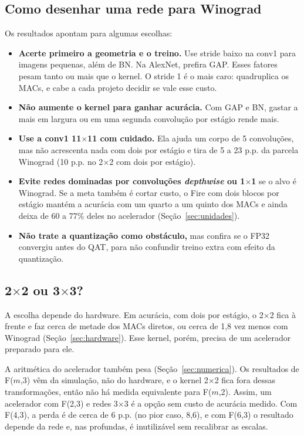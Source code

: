 \documentclass[conference]{IEEEtran}
\newcommand{\by}{\ensuremath{\times}}
\begin{document}
\subsection{Como desenhar uma rede para Winograd}

Os resultados apontam para algumas escolhas:
\begin{itemize}
\item \textbf{Acerte primeiro a geometria e o treino.} Use stride baixo na conv1 para imagens pequenas, além de BN. Na AlexNet, prefira GAP. Esses fatores pesam tanto ou mais que o kernel. O stride 1 é o mais caro: quadruplica os MACs, e cabe a cada projeto decidir se vale esse custo.
\item \textbf{Não aumente o kernel para ganhar acurácia.} Com GAP e BN, gastar a mais em largura ou em uma segunda convolução por estágio rende mais.
\item \textbf{Use a conv1 11\by11 com cuidado.} Ela ajuda um corpo de 5 convoluções, mas não acrescenta nada com dois por estágio e tira de 5 a 23 p.p. da parcela Winograd (10 p.p. no 2\by2 com dois por estágio).
\item \textbf{Evite redes dominadas por convoluções \textit{depthwise} ou 1\by1} se o alvo é Winograd. Se a meta também é cortar custo, o Fire com dois blocos por estágio mantém a acurácia com um quarto a um quinto dos MACs e ainda deixa de 60 a 77\% deles no acelerador (Seção~\ref{sec:unidades}).
\item \textbf{Não trate a quantização como obstáculo,} mas confira se o FP32 convergiu antes do QAT, para não confundir treino extra com efeito da quantização.
\end{itemize}

\subsection{2\by2 ou 3\by3?}
\label{sec:2x2ou3x3}

A escolha depende do hardware. Em acurácia, com dois por estágio, o 2\by2 fica à frente e faz cerca de metade dos MACs diretos, ou cerca de 1,8 vez menos com Winograd (Seção~\ref{sec:hardware}). Esse kernel, porém, precisa de um acelerador preparado para ele.

A aritmética do acelerador também pesa (Seção~\ref{sec:numerica}). Os resultados de F($m$,3) vêm da simulação, não do hardware, e o kernel 2\by2
fica fora dessas transformações, então não há medida equivalente para F($m$,2). Assim, um acelerador com F(2,3) e redes 3\by3 é a opção sem custo de acurácia medido. Com F(4,3), a perda é de cerca de 6 p.p. (no pior caso, 8,6), e com F(6,3) o resultado depende da rede e, nas profundas, é inutilizável sem recalibrar as escalas.
\end{document}
